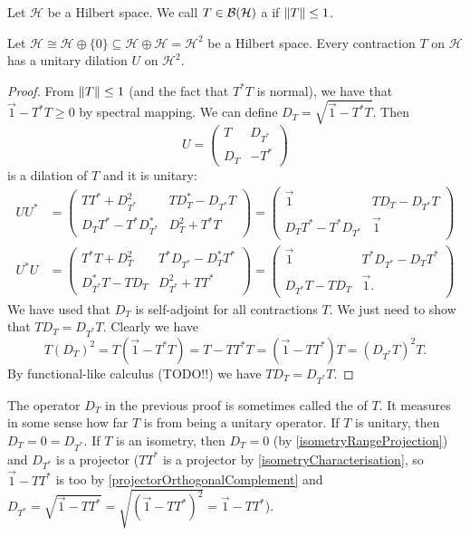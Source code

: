 Let $\mathcal{H}$ be a Hilbert space. We call $T\in\operatorname{\mathcal{B}}(\mathcal{H})$ a  if $\lVert T\rVert\leq 1$.
\begin{proposition} \label{dilationOfContraction}
Let $\mathcal{H} \cong \mathcal{H}\oplus \{0\} \subseteq \mathcal{H}\oplus \mathcal{H} = \mathcal{H}^2$ be a Hilbert space. Every contraction $T$ on $\mathcal{H}$ has a unitary dilation $U$ on $\mathcal{H}^2$.
\end{proposition}
\begin{proof}
From $\lVert T\rVert\leq 1$ (and the fact that $T^*T$ is normal), we have that $\vec{1}-T^*T\geq 0$ by spectral mapping. We can define $D_T = \sqrt{\vec{1}-T^*T}$. Then
\[ U = \begin{pmatrix}
T & D_{T^*} \\ D_T & -T^*
\end{pmatrix} \]
is a dilation of $T$ and it is unitary:
\begin{align*}
UU^* &= \begin{pmatrix}
TT^* + D_{T^*}^2 & TD_T^* - D_{T^*}T \\
D_TT^* - T^*D_{T^*}^* & D^2_{T} + T^*T
\end{pmatrix} = \begin{pmatrix}
\vec{1} & TD_T - D_{T^*}T \\
D_TT^* - T^*D_{T^*} & \vec{1}
\end{pmatrix} \\
U^*U &= \begin{pmatrix}
T^*T + D_{T}^2 & T^*D_{T^*} - D_{T}^*T^* \\
D_{T^*}^*T - TD_{T} & D^2_{T^*} + TT^*
\end{pmatrix} = \begin{pmatrix}
\vec{1} & T^*D_{T^*} - D_{T}T^* \\
D_{T^*}T - TD_{T} & \vec{1}.
\end{pmatrix}
\end{align*}
We have used that $D_T$ is self-adjoint for all contractions $T$. We just need to show that $TD_T = D_{T^*}T$. Clearly we have
\[ T(D_T)^2 = T(\vec{1} - T^*T) = T - TT^*T = (\vec{1} - TT^*)T = (D_{T^*}T)^2T. \]
By functional-like calculus (TODO!!) we have $TD_T = D_{T^*}T$.
\end{proof}
The operator $D_T$ in the previous proof is sometimes called the  of $T$. It measures in some sense how far $T$ is from being a unitary operator. If $T$ is unitary, then $D_T = 0 = D_{T^*}$. If $T$ is an isometry, then $D_T = 0$ (by \ref{isometryRangeProjection}) and $D_{T^*}$ is a projector ($TT^*$ is a projector by \ref{isometryCharacterisation}, so $\vec{1} - TT^*$ is too by \ref{projectorOrthogonalComplement} and $D_{T^*} = \sqrt{\vec{1}-TT^*} = \sqrt{(\vec{1}-TT^*)^2} = \vec{1}-TT^*$).

